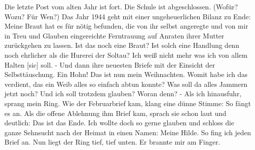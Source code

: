 \def\day{21. Dezember 1944.}
\mktitle

Die letzte Post vom alten Jahr ist fort.
Die Schule ist abgeschlossen.
(Wof\"{u}r? Wozu? F\"{u}r Wen?)
Das Jahr 1944 geht mit einer ungeheuerlichen Bilanz zu Ende: Meine Braut hat es f\"{u}r n\"{o}tig befunden, die von ihr selbst angeregte und von mir in Treu und Glauben eingereichte Ferntrauung auf Anraten ihrer Mutter zur\"{u}ckgehen zu lassen.
Ist das noch eine Braut?
Ist solch eine Handlung denn noch ehrlicher als die Hurerei der Soltau?
Ich wei{\ss} nicht mehr was ich von allem Halten{\color{red} [sic] } soll. -
Und dann ihre neuesten Briefe mit der Einsicht der Selbstt\"{a}uschung.
Ein Hohn!
Das ist nun mein Weihnachten.
Womit habe ich das verdient, das ein Weib alles so einfach abtun konnte?
Was soll da alles Jammern jetzt noch?
Und ich soll trotzdem glauben?
Woran denn? -
Als ich hinausfuhr, sprang mein Ring.
Wie der Februarbrief kam, klang eine d\"{u}nne Stimme: So f\"{a}ngt es an.
Als die offene Ablehnung ihm Brief kam, sprach sie schon laut und deutlich: Das ist das Ende.
Ich wollte doch so gerne glauben und schloss die ganze Sehnsucht nach der Heimat in einen Namen: Meine Hilde.
So fing ich jeden Brief an.
Nun liegt der Ring tief, tief unten.
Er brannte mir am Finger.

\clearpage

